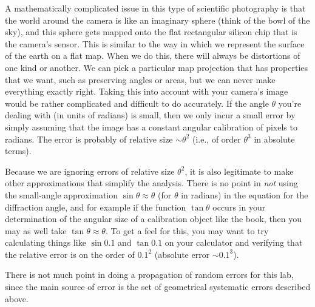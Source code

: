 A mathematically complicated issue in this type of scientific photography is that the world around the camera is like an
imaginary sphere (think of the bowl of the sky), and this sphere gets mapped onto the flat rectangular silicon chip that is
the camera's sensor. This is similar to the way in which we represent the surface of the earth on a flat map. When we do
this, there will always be distortions of one kind or another. We can pick a particular map projection that has properties
that we want, such as preserving angles or areas, but we can never make everything exactly right. Taking this into account
with your camera's image would be rather complicated and difficult to do accurately. If the angle $\theta$ you're dealing with
(in units of radians) is small, then we only incur a small error by simply assuming that the image has a constant angular
calibration of pixels to radians. The error is probably of relative size $\sim\theta^2$ (i.e., of order $\theta^3$ in absolute terms).

Because we are ignoring errors of relative size $\theta^2$, it is also legitimate to make other approximations that simplify
the analysis. There is no point in \emph{not} using the small-angle approximation $\sin\theta\approx\theta$ (for $\theta$ in
radians) in the equation for the diffraction angle, and for example if the function $\tan\theta$ occurs in your determination
of the angular size of a calibration object like the book, then you may as well take $\tan\theta\approx\theta$. To get a
feel for this, you may want to try calculating things like $\sin 0.1$ and $\tan 0.1$ on your calculator and verifying that
the relative error is on the order of $0.1^2$ (absolute error $\sim 0.1^3$).

There is not much point in doing a propagation of random errors for this lab, since the main source of error is the set of
geometrical systematic errors described above.


